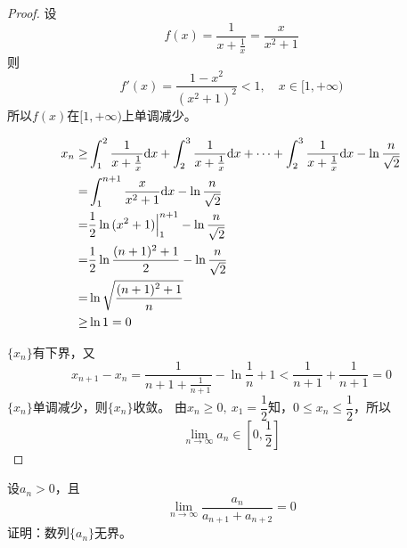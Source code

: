 \begin{proof}

    设
    $$f(x) = \dfrac{1}{x + \frac{1}{x}} = \dfrac{x}{x^2 + 1}$$
    则
    $$f'(x) = \dfrac{1-x^2}{(x^2 + 1)^2} < 1,\quad x\in[1,+\infty)$$
    所以$f(x)$在$[1,+\infty)$上单调减少。

    \begin{align*}
        x_n \geq & \int_{1}^{2}{\dfrac{1}{x+\frac{1}{x}}}\mathrm{d} x + \int_{2}^{3}{\dfrac{1}{x+\frac{1}{x}}}\mathrm{d} x + \cdots + \int_{2}^{3}{\dfrac{1}{x+\frac{1}{x}}}\mathrm{d} x - \ln{\dfrac{n}{\sqrt{2}}} \\
        = & \int_{1}^{n+1}{\dfrac{x}{x^2 + 1}}\mathrm{d} x - \ln{\dfrac{n}{\sqrt{2}}} \\
        = & \dfrac{1}{2} \ln{(x^2 + 1)} \Big|_{1}^{n+1} - \ln{\dfrac{n}{\sqrt{2}}} \\
        = & \dfrac{1}{2} \ln{\dfrac{(n+1)^2 + 1}{2}} - \ln{\dfrac{n}{\sqrt{2}}} \\
        = & \ln{\sqrt{\dfrac{(n+1)^2 + 1}{n}}} \\
        \geq & \ln1 = 0 
    \end{align*}

    $\{x_n\}$有下界，又
    $$x_{n+1} - x_n = \dfrac{1}{n + 1 + \frac{1}{n + 1}} - \ln{\dfrac{1}{n} + 1} < \dfrac{1}{n + 1} + \dfrac{1}{n + 1} = 0$$
    $\{x_n\}$单调减少，则$\{x_n\}$收敛。
    由$x_n \geq 0,\ x_1 = \dfrac{1}{2} $知，$0 \leq x_n \leq \dfrac{1}{2}$，所以
    $$\lim\limits_{n\to\infty}{a_n} \in \left[0,\dfrac{1}{2}\right]$$

\end{proof}

\begin{proposition}

    设$a_n > 0$，且
    $$\lim\limits_{n\to\infty}{\dfrac{a_n}{a_{n+1} + a_{n+2}}} = 0$$
    证明：数列$\{a_n\}$无界。
    
\end{proposition}

